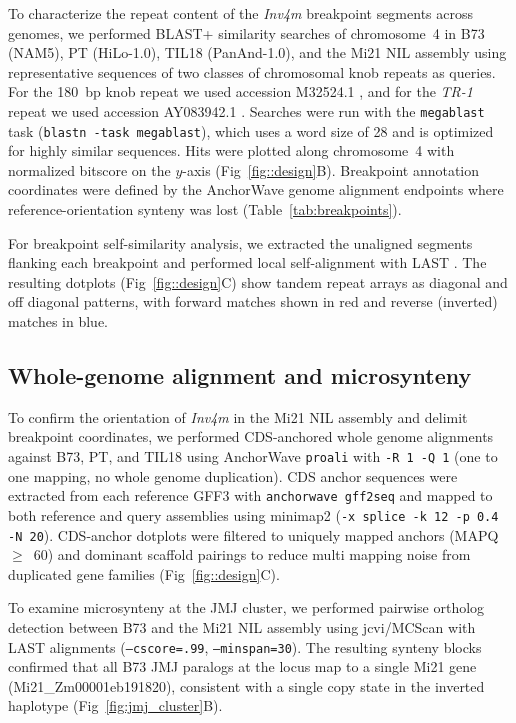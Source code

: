 \documentclass[9pt,twocolumn,twoside]{rilabRxiv}
\newcommand{\invfour}{\textit{Inv4m}\xspace}
\begin{document}
To characterize the repeat content of the \invfour breakpoint segments across genomes, we performed BLAST+ \cite{camacho2009} similarity searches of chromosome~4 in B73 (NAM5), PT (HiLo-1.0), TIL18 (PanAnd-1.0), and the Mi21 NIL assembly using representative sequences of two classes of chromosomal knob repeats as queries.
For the 180~bp knob repeat we used accession M32524.1 \cite{dennis1984}, and for the \textit{TR-1} repeat we used accession AY083942.1 \cite{hsu2003}.
Searches were run with the \texttt{megablast} task (\texttt{blastn -task megablast}), which uses a word size of 28 and is optimized for highly similar sequences.
Hits were plotted along chromosome~4 with normalized bitscore on the $y$-axis (Fig~\ref{fig::design}B).
Breakpoint annotation coordinates were defined by the AnchorWave \cite{song2022} genome alignment endpoints where reference-orientation synteny was lost (Table~\ref{tab:breakpoints}).

For breakpoint self-similarity analysis, we extracted the unaligned segments flanking each breakpoint and performed local self-alignment with LAST \cite{kielbasa2011}.
The resulting dotplots (Fig~\ref{fig::design}C) show tandem repeat arrays as diagonal and off diagonal patterns, with forward matches shown in red and reverse (inverted) matches in blue.

\subsection{Whole-genome alignment and microsynteny}

To confirm the orientation of \invfour in the Mi21 NIL assembly and delimit breakpoint coordinates, we performed CDS-anchored whole genome alignments against B73, PT, and TIL18 using AnchorWave \cite{song2022} \texttt{proali} with \texttt{-R~1 -Q~1} (one to one mapping, no whole genome duplication).
CDS anchor sequences were extracted from each reference GFF3 with \texttt{anchorwave gff2seq} and mapped to both reference and query assemblies using minimap2 \cite{li2018minimap2} (\texttt{-x splice -k 12 -p 0.4 -N 20}).
CDS-anchor dotplots were filtered to uniquely mapped anchors (MAPQ~$\geq$~60) and dominant scaffold pairings to reduce multi mapping noise from duplicated gene families (Fig~\ref{fig::design}C).

To examine microsynteny at the JMJ cluster, we performed pairwise ortholog detection between B73 and the Mi21 NIL assembly using jcvi/MCScan \cite{tang2008jcvi} with LAST \cite{kielbasa2011} alignments (\texttt{--cscore=.99}, \texttt{--minspan=30}).
The resulting synteny blocks confirmed that all B73 JMJ paralogs at the locus map to a single Mi21 gene (Mi21\_Zm00001eb191820), consistent with a single copy state in the inverted haplotype (Fig~\ref{fig:jmj_cluster}B).
\end{document}
